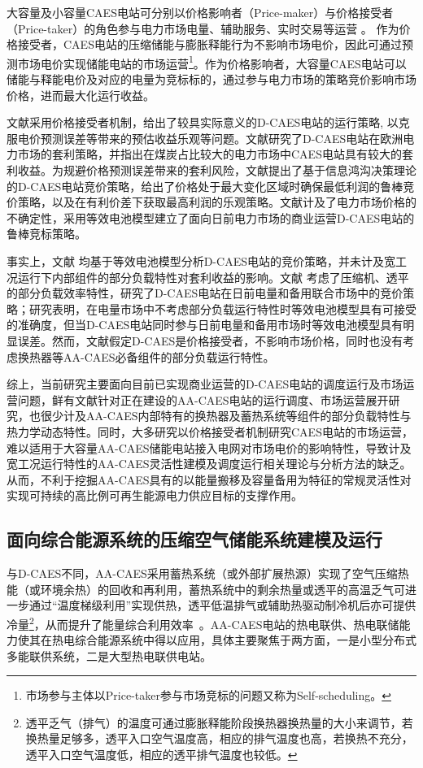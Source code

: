 大容量及小容量CAES电站可分别以价格影响者（Price-maker）与价格接受者（Price-taker）的角色参与电力市场电量、辅助服务、实时交易等运营
\cite{CAES-BidOff-Curve-17}。 作为价格接受者，CAES电站的压缩储能与膨胀释能行为不影响市场电价，因此可通过预测市场电价实现储能电站的市场运营\footnote{市场参与主体以Price-taker参与市场竞标的问题又称为Self-scheduling。}。作为价格影响者，大容量CAES电站可以储能与释能电价及对应的电量为竞标标的，通过参与电力市场的策略竞价影响市场价格，进而最大化运行收益\cite{Thesis-Shafiee}。

文献采用价格接受者机制，给出了较具实际意义的D-CAES电站的运行策略, 以克服电价预测误差等带来的预估收益乐观等问题。文献研究了D-CAES电站在欧洲电力市场的套利策略，并指出在煤炭占比较大的电力市场中CAES电站具有较大的套利收益。为规避价格预测误差带来的套利风险，文献提出了基于信息鸿沟决策理论的D-CAES电站竞价策略，给出了价格处于最大变化区域时确保最低利润的鲁棒竞价策略，以及在有利价差下获取最高利润的乐观策略。文献计及了电力市场价格的不确定性，采用等效电池模型建立了面向日前电力市场的商业运营D-CAES电站的鲁棒竞标策略。

事实上，文献 均基于等效电池模型分析D-CAES电站的竞价策略，并未计及宽工况运行下内部组件的部分负载特性对套利收益的影响。文献 考虑了压缩机、透平的部分负载效率特性，研究了D-CAES电站在日前电量和备用联合市场中的竞价策略；研究表明，在电量市场中不考虑部分负载运行特性时等效电池模型具有可接受的准确度，但当D-CAES电站同时参与日前电量和备用市场时等效电池模型具有明显误差\cite{CAES-Reserve-Bid-Therm-16}。然而，文献假定D-CAES是价格接受者，不影响市场价格，同时也没有考虑换热器等AA-CAES必备组件的部分负载运行特性。

综上，当前研究主要面向目前已实现商业运营的D-CAES电站的调度运行及市场运营问题，鲜有文献针对正在建设的AA-CAES电站的运行调度、市场运营展开研究，也很少计及AA-CAES内部特有的换热器及蓄热系统等组件的部分负载特性与热力学动态特性。同时，大多研究以价格接受者机制研究CAES电站的市场运营，难以适用于大容量AA-CAES储能电站接入电网对市场电价的影响特性，导致计及宽工况运行特性的AA-CAES灵活性建模及调度运行相关理论与分析方法的缺乏。从而，不利于挖掘AA-CAES具有的以能量搬移及容量备用为特征的常规灵活性对实现可持续的高比例可再生能源电力供应目标的支撑作用。

\subsection{面向综合能源系统的压缩空气储能系统建模及运行}
与D-CAES不同，AA-CAES采用蓄热系统（或外部扩展热源）实现了空气压缩热能（或环境余热）的回收和再利用，蓄热系统中的剩余热量或透平的高温乏气可进一步通过“温度梯级利用”实现供热，透平低温排气或辅助热驱动制冷机后亦可提供冷量\footnote{透平乏气（排气）的温度可通过膨胀释能阶段换热器换热量的大小来调节，若换热量足够多，透平入口空气温度高，相应的排气温度也高，若换热不充分，透平入口空气温度低，相应的透平排气温度也较低。}，从而提升了能量综合利用效率~\cite{Trigen-mCAES-15,CAES-Alberta-14,TES-Eff-CAES-13}。AA-CAES电站的热电联供、热电联储能力使其在热电综合能源系统中得以应用，具体主要聚焦于两方面，一是小型分布式多能联供系统，二是大型热电联供电站。

